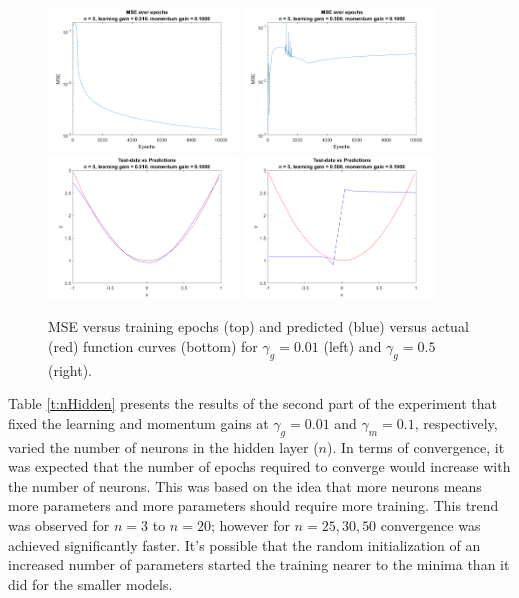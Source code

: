 \documentclass[11pt,pdftex,portrait,letterpaper]{article}
\begin{document}
\begin{figure}[h]
    \centering
    \includegraphics[width=0.45\textwidth]{./figures/mse_5_0.010_0.1000}
    \includegraphics[width=0.45\textwidth]{./figures/mse_5_0.500_0.1000}\\
    \includegraphics[width=0.45\textwidth]{./figures/function_fitting_5_0.010_0.1000}
    \includegraphics[width=0.45\textwidth]{./figures/function_fitting_5_0.500_0.1000}
    \caption{MSE versus training epochs (top) and predicted (blue) versus actual (red) function curves (bottom) for $\gamma_g=0.01$ (left) and $\gamma_g=0.5$ (right).}
    \label{f:gainsCompare}
\end{figure}

Table \ref{t:nHidden} presents the results of the second part of the experiment that fixed the learning and momentum gains at $\gamma_g=0.01$ and $\gamma_m=0.1$, respectively, varied the number of neurons in the hidden layer ($n$). In terms of convergence, it was expected that the number of epochs required to converge would increase with the number of neurons. This was based on the idea that more neurons means more parameters and more parameters should require more training. This trend was observed for $n=3$ to $n=20$; however for $n={25, 30, 50}$ convergence was achieved significantly faster. It's possible that the random initialization of an increased number of parameters started the training nearer to the minima than it did for the smaller models.
\end{document}
